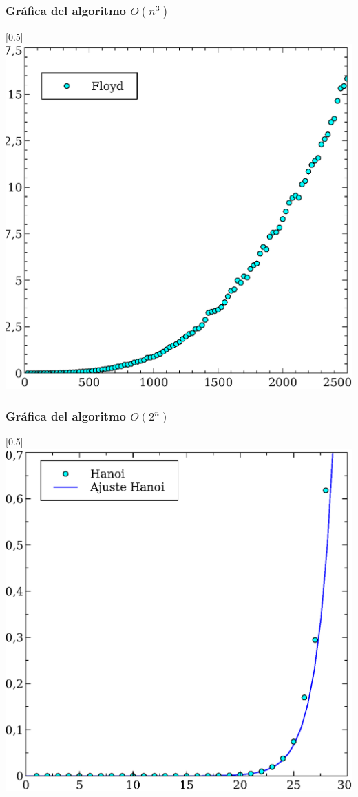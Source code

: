 \documentclass[compress]{beamer}
\begin{document}
\begin{frame}
\frametitle{Gráfica del algoritmo $O(n^3)$}
	\begin{center}
\scalebox{0.53}[0.5]{
    \includegraphics[]{n3.eps}
}
\end{center}
\end{frame}
\begin{frame}
\frametitle{Gráfica del algoritmo $O(2^n)$}
	\begin{center}
\scalebox{0.53}[0.5]{
    \includegraphics[]{2n_ajuste.eps}
}
\end{center}
\end{frame}
\end{document}
